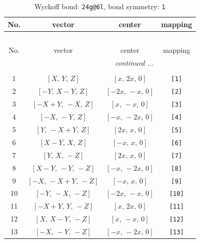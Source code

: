 \documentclass[fleqn,8pt]{jsarticle}
\begin{document}
\begin{longtable}{cccc}
\caption{Wyckoff bond: {\tt 24g@6l}, bond symmetry: {\tt 1}}
 \\
 \hline \hline
No. & vector & center & mapping \\ \hline \endfirsthead

\multicolumn{3}{l}{\tablename\ \thetable{}} \\
 \hline \hline
No. & vector & center & mapping \\ \hline \endhead

 \hline \hline
\multicolumn{3}{r}{\footnotesize\it continued ...} \\ \endfoot

 \hline \hline
\multicolumn{3}{r}{} \\ \endlastfoot

1 & $\left[ X,\, Y,\, Z \right]$ & $\left[ x,\, 2 x,\, 0 \right]$ & {\tt [1]} \\ \hline
2 & $\left[ - Y,\, X - Y,\, Z \right]$ & $\left[ - 2 x,\, - x,\, 0 \right]$ & {\tt [2]} \\ \hline
3 & $\left[ - X + Y,\, - X,\, Z \right]$ & $\left[ x,\, - x,\, 0 \right]$ & {\tt [3]} \\ \hline
4 & $\left[ - X,\, - Y,\, Z \right]$ & $\left[ - x,\, - 2 x,\, 0 \right]$ & {\tt [4]} \\ \hline
5 & $\left[ Y,\, - X + Y,\, Z \right]$ & $\left[ 2 x,\, x,\, 0 \right]$ & {\tt [5]} \\ \hline
6 & $\left[ X - Y,\, X,\, Z \right]$ & $\left[ - x,\, x,\, 0 \right]$ & {\tt [6]} \\ \hline
7 & $\left[ Y,\, X,\, - Z \right]$ & $\left[ 2 x,\, x,\, 0 \right]$ & {\tt [7]} \\ \hline
8 & $\left[ X - Y,\, - Y,\, - Z \right]$ & $\left[ - x,\, - 2 x,\, 0 \right]$ & {\tt [8]} \\ \hline
9 & $\left[ - X,\, - X + Y,\, - Z \right]$ & $\left[ - x,\, x,\, 0 \right]$ & {\tt [9]} \\ \hline
10 & $\left[ - Y,\, - X,\, - Z \right]$ & $\left[ - 2 x,\, - x,\, 0 \right]$ & {\tt [10]} \\ \hline
11 & $\left[ - X + Y,\, Y,\, - Z \right]$ & $\left[ x,\, 2 x,\, 0 \right]$ & {\tt [11]} \\ \hline
12 & $\left[ X,\, X - Y,\, - Z \right]$ & $\left[ x,\, - x,\, 0 \right]$ & {\tt [12]} \\ \hline
13 & $\left[ - X,\, - Y,\, - Z \right]$ & $\left[ - x,\, - 2 x,\, 0 \right]$ & {\tt [13]} \\ \hline

\end{longtable}
\end{document}
